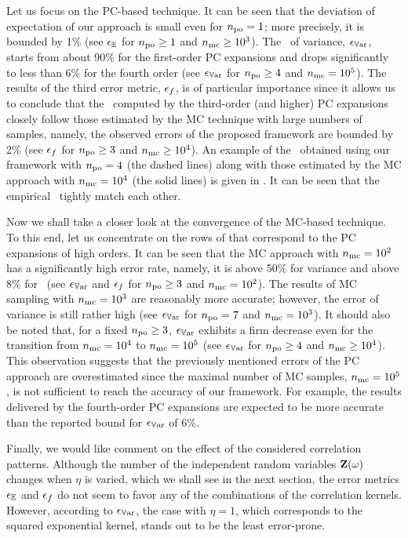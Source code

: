 Let us focus on the PC-based technique.
It can be seen that the deviation of expectation of our approach is small even for ${n_\text{po}} = 1$; more precisely, it is bounded by 1\% (see $\epsilon_\mathbb{E}$ for ${n_\text{po}} \geq 1$ and ${n_\text{mc}} \geq 10^3$).
The \nrmse\ of variance, $\epsilon_{\mathbb{V}\text{ar}}$, starts from about 90\% for the first-order PC expansions and drops significantly to less than 6\% for the fourth order (see $\epsilon_{\mathbb{V}\text{ar}}$ for ${n_\text{po}} \geq 4$ and ${n_\text{mc}} = 10^5$).
The results of the third error metric, $\epsilon_f$, is of particular importance since it allows us to conclude that the \pdfs\ computed by the third-order (and higher) PC expansions closely follow those estimated by the MC technique with large numbers of samples, namely, the observed errors of the proposed framework are bounded by 2\% (see $\epsilon_f$ for ${n_\text{po}} \geq 3$ and ${n_\text{mc}} \geq 10^4$).
An example of the \pdfs\ obtained using our framework with ${n_\text{po}} = 4$ (the dashed lines) along with those estimated by the MC approach with ${n_\text{mc}} = 10^4$ (the solid lines) is given in .
It can be seen that the empirical \pdfs\ tightly match each other.

Now we shall take a closer look at the convergence of the MC-based technique. To this end, let us concentrate on the rows of  that correspond to the PC expansions of high orders.
It can be seen that the MC approach with ${n_\text{mc}} = 10^2$ has a significantly high error rate, namely, it is above 50\% for variance and above 8\% for \pdfs\ (see $\epsilon_{\mathbb{V}\text{ar}}$ and $\epsilon_f$ for ${n_\text{po}} \geq 3$ and ${n_\text{mc}} = 10^2$).
The results of MC sampling with ${n_\text{mc}} = 10^3$ are reasonably more accurate; however, the error of variance is still rather high (see $\epsilon_{\mathbb{V}\text{ar}}$ for ${n_\text{po}} = 7$ and ${n_\text{mc}} = 10^3$).
It should also be noted that, for a fixed ${n_\text{po}} \geq 3$, $\epsilon_{\mathbb{V}\text{ar}}$ exhibits a firm decrease even for the transition from ${n_\text{mc}} = 10^4$ to ${n_\text{mc}} = 10^5$ (see $\epsilon_{\mathbb{V}\text{ar}}$ for ${n_\text{po}} \geq 4$ and ${n_\text{mc}} \geq 10^4$).
This observation suggests that the previously mentioned errors of the PC approach are overestimated since the maximal number of MC samples, ${n_\text{mc}} = 10^5$, is not sufficient to reach the accuracy of our framework.
For example, the results delivered by the fourth-order PC expansions are expected to be more accurate than the reported bound for $\epsilon_{\mathbb{V}\text{ar}}$ of 6\%.

Finally, we would like comment on the effect of the considered correlation patterns.
Although the number of the independent random variables $\mathbf{Z}(\omega)$ changes when $\eta$ is varied, which we shall see in the next section, the error metrics $\epsilon_\mathbb{E}$ and $\epsilon_f$ do not seem to favor any of the combinations of the correlation kernels.
However, according to $\epsilon_{\mathbb{V}\text{ar}}$, the case with $\eta = 1$, which corresponds to the squared exponential kernel, stands out to be the least error-prone.


